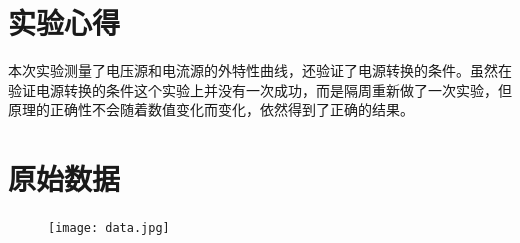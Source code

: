 \documentclass[a4paper,utf8]{article}
\begin{document}
\section{实验心得}
    本次实验测量了电压源和电流源的外特性曲线，还验证了电源转换的条件。虽然在验证电源转换的条件这个实验上并没有一次成功，而是隔周重新做了一次实验，但原理的正确性不会随着数值变化而变化，依然得到了正确的结果。
\newpage
\section{原始数据}
    \begin{figure}[!ht]
        \texttt{[image: data.jpg]}
    \end{figure}
\end{document}
